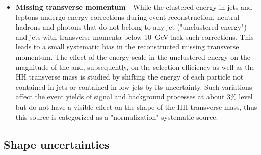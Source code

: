 \begin{itemize}

\item{\bf Missing transverse momentum} - While the clustered energy in
  jets and leptons undergo energy corrections during event
  reconstruction, neutral hadrons and photons that do not belong to any jet
  ("unclustered energy") and jets with transverse momenta below
  10~GeV lack such corrections. This leads to a small systematic
  bias in the reconstructed missing transverse momentum. The effect of the
  energy scale in the unclustered energy on the magnitude of the
  \ptvecmiss and, subsequently, on the selection efficiency as well as
  the HH transverse mass is studied by shifting the energy of each
  particle not contained in jets or contained in low-\pt jets by its
  uncertainty. Such variations
  affect the event yields of signal and background processes at about
  3\% level but do not have a visible effect on the shape of the HH
  transverse mass, thus this source is categorized as a
  "normalization" systematic source.

\end{itemize}

\subsection{Shape uncertainties}

